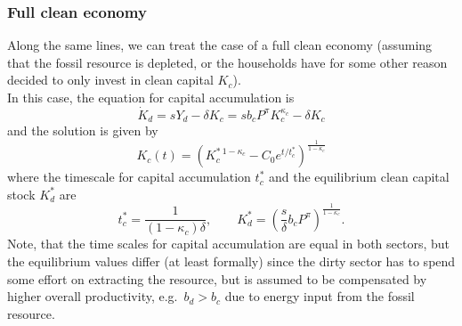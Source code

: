 \subsubsection{Full clean economy}
Along the same lines, we can treat the case of a full clean economy (assuming that the fossil resource is depleted, or the households have for some other reason decided to only invest in clean capital $K_c$). \\
In this case, the equation for capital accumulation is
\begin{equation}
	\dot{K}_d = s Y_d - \delta K_c = s b_c P^{\pi} K_c^{\kappa_c} - \delta K_c
	\label{eq:full_clean_ca1}
\end{equation}
and the solution is given by
\begin{equation}
	K_c(t) = \left( K_c^{*\ 1-\kappa_c} - C_0 e^{t/t^*_c} \right)^{\frac{1}{1-\kappa_c}}
	\label{eq:full_clean_ca2}
\end{equation}
where the timescale for capital accumulation $t^*_c$ and the equilibrium clean capital stock $K^*_d$ are
\begin{equation}
	t_c^{*} = \frac{1}{(1-\kappa_c)\delta}, \qquad K_d^{*} = \left( \frac{s}{\delta}b_c P^{\pi}\right)^{\frac{1}{1-\kappa_c}}.
	\label{eq:clean_capital_equilibrium_values}
\end{equation}
Note, that the time scales for capital accumulation are equal in both sectors, but the equilibrium values differ (at least formally) since the dirty sector has to spend some effort on extracting the resource, but is assumed to be compensated by higher overall productivity, e.g.\ $b_d > b_c$ due to energy input from the fossil resource.

